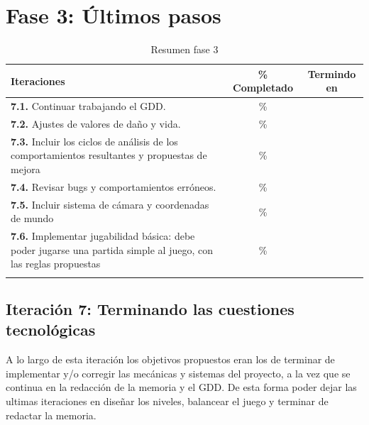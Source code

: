 \section{Fase 3: Últimos pasos}
\begin{longtable}[c]{|p{7cm}|c|c|}
\hline
Iteraciones                                                & \% Completado & Termindo en \\ 
\hline
\endhead
\textbf{7.1.} Continuar trabajando el GDD.                 & \% &   \\
	\cmidrule[.003pt]{1-3}
\textbf{7.2.} Ajustes de valores de daño y vida.           & \% &   \\ 
	\cmidrule[.003pt]{1-3}
\textbf{7.3.} Incluir los ciclos de análisis de los 
				comportamientos resultantes y 
				propuestas de mejora                       & \% &   \\ 
	\cmidrule[.003pt]{1-3}
\textbf{7.4.} Revisar bugs y comportamientos erróneos.     & \% &   \\
	\cmidrule[.003pt]{1-3}
\textbf{7.5.} Incluir sistema de cámara y coordenadas 
				de mundo                                   & \% &   \\
	\cmidrule[.003pt]{1-3}
\textbf{7.6.} Implementar jugabilidad básica: debe poder
				jugarse una partida simple al juego, con
				las reglas propuestas                      & \% &   \\

\hline
\caption{Resumen fase 3}
\end{longtable}

\subsection*{Iteración 7: Terminando las cuestiones tecnológicas}
A lo largo de esta iteración los objetivos propuestos eran los de terminar de implementar y/o corregir
las mecánicas y sistemas del proyecto, a la vez que se continua en la redacción de la memoria y el GDD.
De esta forma poder dejar las ultimas iteraciones en diseñar los niveles, balancear el juego y terminar
de redactar la memoria.




  
